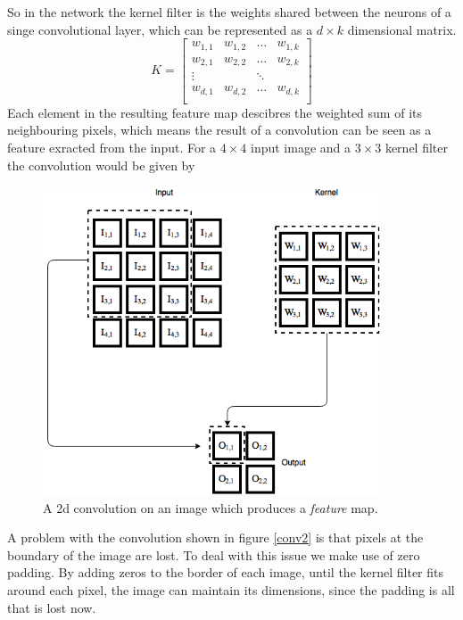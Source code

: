 \documentclass[11pt]{article}
\begin{document}
So in the network the kernel filter is the weights shared between the neurons of a
singe convolutional layer, which can be represented as a $d \times k$ dimensional matrix.
$$
K =
\begin{bmatrix}
    w_{1,1 } & w_{1, 2} & \hdots & w_{1, k} \\
    w_{2,1 } & w_{2, 2} & \hdots & w_{2, k} \\
    \vdots   &          & \ddots &          \\
    w_{d,1 } & w_{d, 2} & \hdots & w_{d, k} \\
\end{bmatrix}
$$
Each element in the resulting feature map descibres the weighted sum of its neighbouring
pixels, which means the result of a convolution can be seen as a feature exracted from
the input.
For a $4 \times 4$ input image and a $3 \times 3$ kernel filter the convolution
would be given by
\begin{figure}[!h]\label{conv2}
    \centering
    \includegraphics[width=10cm]{include/conv_2.png}
    \caption{A 2d convolution on an image which produces a \textit{feature} map.}
    \label{fig:conv}
\end{figure}
A problem with the convolution shown in figure \ref{conv2} is that
pixels at the boundary of the image are lost.
To deal with this issue we make use of zero padding.
By adding zeros to the border of each image, until the kernel
filter fits around each pixel, the image can maintain its dimensions, since the
padding is all that is lost now.
\end{document}
